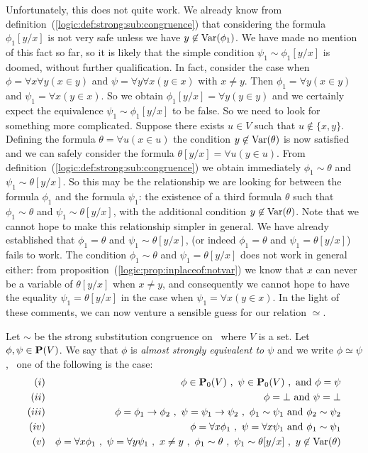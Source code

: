 Unfortunately, this does not quite work. We already know from
definition~(\ref{logic:def:strong:sub:congruence}) that considering
the formula $\phi_{1}[y/x]$ is not very safe unless we have
$y\not\in\mbox{\rm Var}(\phi_{1})$. We have made no mention of this fact so
far, so it is likely that the simple condition
$\psi_{1}\sim\phi_{1}[y/x]$ is doomed, without further
qualification. In fact, consider the case when $\phi=\forall
x\forall y (x\in y)$ and $\psi=\forall y\forall x(y\in x)$ with
$x\neq y$. Then $\phi_{1}=\forall y(x\in y)$ and $\psi_{1}=\forall
x(y\in x)$. So we obtain $\phi_{1}[y/x]=\forall y(y\in y)$ and we
certainly expect the equivalence $\psi_{1}\sim\phi_{1}[y/x]$ to be
false. So we need to look for something more complicated. Suppose
there exists $u\in V$ such that $u\not\in\{x,y\}$. Defining the
formula $\theta=\forall u (x\in u)$ the condition
$y\not\in\mbox{\rm Var}(\theta)$ is now satisfied and we can safely consider
the formula $\theta[y/x]=\forall u(y\in u)$. From
definition~(\ref{logic:def:strong:sub:congruence}) we obtain
immediately $\phi_{1}\sim\theta$ and $\psi_{1}\sim\theta[y/x]$. So
this may be the relationship we are looking for between the formula
$\phi_{1}$ and the formula $\psi_{1}$: the existence of a third
formula $\theta$ such that $\phi_{1}\sim\theta$ and
$\psi_{1}\sim\theta[y/x]$, with the additional condition
$y\not\in\mbox{\rm Var}(\theta)$. Note that we cannot hope to make this
relationship simpler in general. We have already established that
$\phi_{1}=\theta$ and $\psi_{1}\sim\theta[y/x]$, (or indeed
$\phi_{1}=\theta$ and $\psi_{1}=\theta[y/x]$) fails to work. The
condition $\phi_{1}\sim\theta$ and $\psi_{1}=\theta[y/x]$ does not
work in general either: from
proposition~(\ref{logic:prop:inplaceof:notvar}) we know that $x$ can
never be a variable of $\theta[y/x]$ when $x\neq y$, and
consequently we cannot hope to have the equality
$\psi_{1}=\theta[y/x]$ in the case when $\psi_{1}=\forall x(y\in
x)$. In the light of these comments, we can now venture a sensible
guess for our relation $\simeq$.

\begin{defin}\label{logic:def:almost:strong:equivalent}
Let $\sim$ be the strong substitution congruence on \pv\ where $V$ is a set. Let $\phi,\psi\in\mbox{${\bf P}(V)$}$. We say that $\phi$ is {\em almost strongly equivalent to $\psi$} and we write $\phi\simeq\psi$, \ifand\ one of the following is the case:
    \begin{eqnarray*}
    (i)&&\phi\in\pvo\ ,\ \psi\in\pvo\ ,\ \mbox{and}\ \phi=\psi\\
    (ii)&&\phi=\bot\ \mbox{and}\ \psi=\bot\\
    (iii)&&\phi=\phi_{1}\to\phi_{2}\ ,\ \psi=\psi_{1}\to\psi_{2}\ ,\
    \phi_{1}\sim\psi_{1}\ \mbox{and}\ \phi_{2}\sim\psi_{2}\\
    (iv)&&\phi=\forall x\phi_{1}\ ,\ \psi=\forall x\psi_{1}\ \mbox{and}\ \phi_{1}\sim\psi_{1}\\
    (v)&&\phi=\forall x\phi_{1}\ ,\ \psi=\forall y\psi_{1}\ ,\ x\neq y\ ,\
    \phi_{1}\sim \theta\ ,\ \psi_{1}\sim \theta[y/x]\ ,\ y\not\in\var(\theta)
    \end{eqnarray*}
\end{defin}

